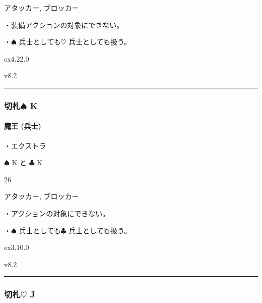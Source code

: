 \documentclass[letterpaper,10pt,dvipdfmx]{sphinxmanual}
\begin{document}
\sphinxAtStartPar
{} アタッカー, ブロッカー

\sphinxAtStartPar
{}

\sphinxAtStartPar
・装備アクションの対象にできない。

\sphinxAtStartPar
・{\normalsize $\spadesuit$} 兵士としても{\normalsize $\heartsuit$} 兵士としても扱う。

\sphinxAtStartPar
{}  ex4.22.0

\sphinxAtStartPar
{}  v8.2


\bigskip\hrule\bigskip



\subsubsection{切札{\normalsize $\spadesuit$} K}
\label{\detokenize{auto/frameActionlist:id93}}

\paragraph{魔王 (兵士)}
\label{\detokenize{auto/frameActionlist:char-darklord}}\label{\detokenize{auto/frameActionlist:id94}}
\sphinxAtStartPar
{}

\sphinxAtStartPar
・エクストラ

\sphinxAtStartPar
{} {\normalsize $\spadesuit$} K と {\normalsize $\clubsuit$} K

\sphinxAtStartPar
{} 26

\sphinxAtStartPar
{} アタッカー, ブロッカー

\sphinxAtStartPar
{}

\sphinxAtStartPar
・アクションの対象にできない。

\sphinxAtStartPar
・{\normalsize $\spadesuit$} 兵士としても{\normalsize $\clubsuit$} 兵士としても扱う。

\sphinxAtStartPar
{}  ex3.10.0

\sphinxAtStartPar
{}  v8.2


\bigskip\hrule\bigskip



\subsubsection{切札{\normalsize $\heartsuit$} J}
\label{\detokenize{auto/frameActionlist:id95}}
\end{document}
